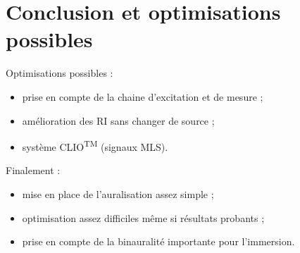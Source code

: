 \documentclass{beamer}
\begin{document}
\section{Conclusion et optimisations possibles}

\begin{frame}

Optimisations possibles :

\begin{itemize}
    \item prise en compte de la chaine d'excitation et de mesure ;
    \item amélioration des RI sans changer de source ;
    \item système CLIO\textsuperscript{\textsc{TM}} (signaux MLS).
\end{itemize}

Finalement :

\begin{itemize}
    \item mise en place de l'auralisation assez simple ;
    \item optimisation assez difficiles même si résultats probants ;
    \item prise en compte de la binauralité importante pour l'immersion.
\end{itemize}
\end{frame}
\end{document}
